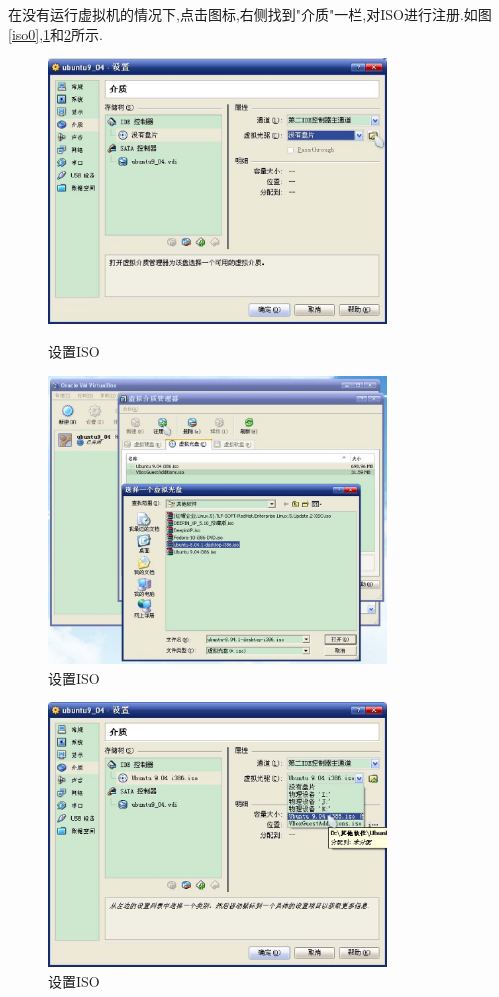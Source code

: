 \documentclass[12pt,a4paper]{article}
\begin{document}
在没有运行虚拟机的情况下,点击图标,右侧找到"介质"一栏,对ISO进行注册.如图\ref{iso0},\ref{iso1}和\ref{iso2}所示.
\begin{figure}[!bthp]
\centering
\includegraphics[width=0.8\textwidth,scale=0.8]{pic/f_vb_setting_iso.eps}
\caption{设置ISO\label{iso0}}
\includegraphics[width=0.8\textwidth,scale=0.8]{pic/f_vb_setting_iso_register.eps}
\caption{设置ISO\label{iso1}}
\end{figure}
\begin{figure}[!bthp]
\centering
\includegraphics[width=0.8\textwidth,scale=0.8]{pic/f_vb_setting_iso_set.eps}
\caption{设置ISO\label{iso2}}
\end{figure}
\end{document}
